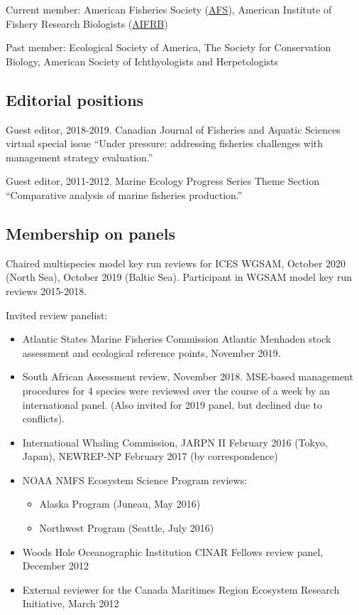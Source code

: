 \documentclass[11pt, a4paper]{awesome-cv}
\providecommand{\tightlist}{%
	\setlength{\itemsep}{0pt}\setlength{\parskip}{0pt}}
\begin{document}
Current member: American Fisheries Society
(\href{https://fisheries.org/}{AFS}), American Institute of Fishery
Research Biologists (\href{https://www.aifrb.org/}{AIFRB})

Past member: Ecological Society of America, The Society for Conservation
Biology, American Society of Ichthyologists and Herpetologists

\hypertarget{editorial-positions}{%
\subsection{Editorial positions}\label{editorial-positions}}

Guest editor, 2018-2019. Canadian Journal of Fisheries and Aquatic
Sciences virtual special issue ``Under pressure: addressing fisheries
challenges with management strategy evaluation.''

Guest editor, 2011-2012. Marine Ecology Progress Series Theme Section
``Comparative analysis of marine fisheries production.''

\hypertarget{membership-on-panels}{%
\subsection{Membership on panels}\label{membership-on-panels}}

Chaired multispecies model key run reviews for ICES WGSAM, October 2020
(North Sea), October 2019 (Baltic Sea). Participant in WGSAM model key
run reviews 2015-2018.

Invited review panelist:

\begin{itemize}
\item
  Atlantic States Marine Fisheries Commission Atlantic Menhaden stock
  assessment and ecological reference points, November 2019.
\item
  South African Assessment review, November 2018. MSE-based management
  procedures for 4 species were reviewed over the course of a week by an
  international panel. (Also invited for 2019 panel, but declined due to
  conflicts).
\item
  International Whaling Commission, JARPN II February 2016 (Tokyo,
  Japan), NEWREP-NP February 2017 (by correspondence)
\item
  NOAA NMFS Ecosystem Science Program reviews:

  \begin{itemize}
  \tightlist
  \item
    Alaska Program (Juneau, May 2016)
  \item
    Northwest Program (Seattle, July 2016)
  \end{itemize}
\item
  Woods Hole Oceanographic Institution CINAR Fellows review panel,
  December 2012
\item
  External reviewer for the Canada Maritimes Region Ecosystem Research
  Initiative, March 2012
\end{itemize}
\end{document}
